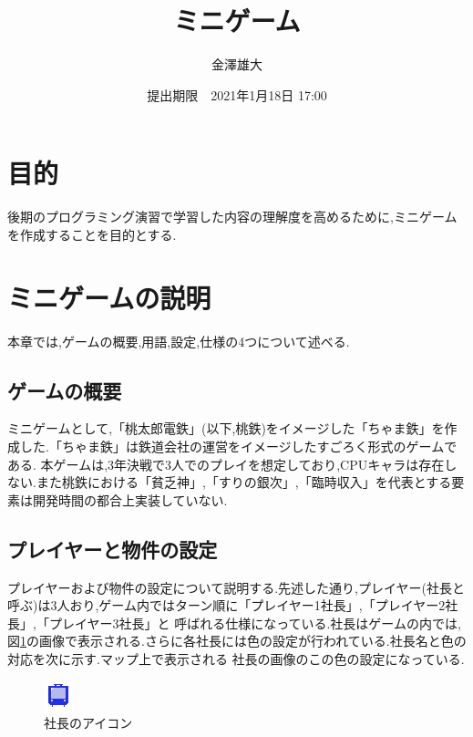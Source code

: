\documentclass[a4j]{jarticle}
\title{ミニゲーム}
\date{提出期限　2021年1月18日 17:00}
\author{金澤雄大}
\begin{document}
    \maketitle
    \thispagestyle{empty}
    \clearpage
    \addtocounter{page}{-1}
    \section{目的}
    後期のプログラミング演習で学習した内容の理解度を高めるために,ミニゲームを作成することを目的とする.
    \section{ミニゲームの説明}
    本章では,ゲームの概要,用語,設定,仕様の4つについて述べる.
    \subsection{ゲームの概要}
    ミニゲームとして,「桃太郎電鉄」\cite{mmtt}(以下,桃鉄)をイメージした「ちゃま鉄」を作成した.「ちゃま鉄」は鉄道会社の運営をイメージしたすごろく形式のゲームである.
    本ゲームは,3年決戦で3人でのプレイを想定しており,CPUキャラは存在しない.また桃鉄における「貧乏神」,「すりの銀次」,「臨時収入」を代表とする要素は開発時間の都合上実装していない.
    \subsection{プレイヤーと物件の設定}
    プレイヤーおよび物件の設定について説明する.先述した通り,プレイヤー(社長と呼ぶ)は3人おり,ゲーム内ではターン順に「プレイヤー1社長」,「プレイヤー2社長」,「プレイヤー3社長」と
    呼ばれる仕様になっている.社長はゲームの内では,図\ref{iconshachou}の画像で表示される.さらに各社長には色の設定が行われている.社長名と色の対応を次に示す.マップ上で表示される
    社長の画像のこの色の設定になっている.

    \begin{figure}[H]
        \centering
        \includegraphics[scale=3.0]{player1.png}
        \caption{社長のアイコン}
         \label{iconshachou}
        \end{figure}
    
\end{document}
